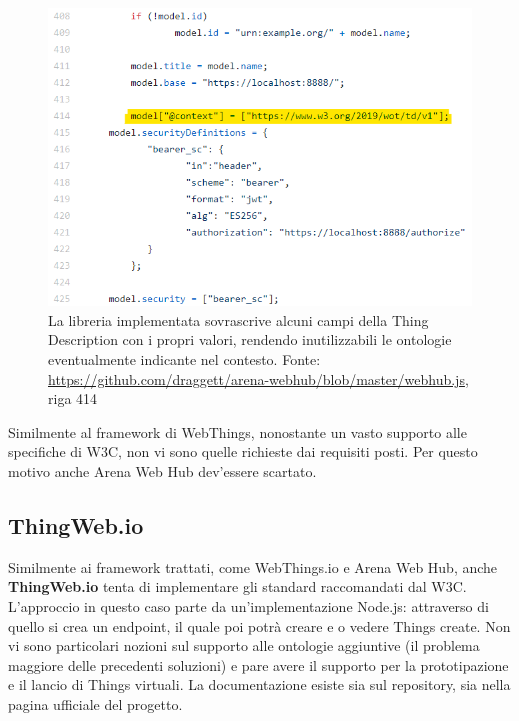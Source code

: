 \documentclass[12pt,a4paper,openright,oneside]{report}
\begin{document}
\begin{figure}[h]
	\centering
	\includegraphics[scale=1]{eps/context_overwritten.png}
	\caption{La libreria implementata sovrascrive alcuni campi della Thing Description con i propri valori, rendendo inutilizzabili le ontologie eventualmente indicante nel contesto. Fonte: \url{https://github.com/draggett/arena-webhub/blob/master/webhub.js}, riga 414}
	\label{fig:context-overwritten}
\end{figure}

Similmente al framework di WebThings, nonostante un vasto supporto alle specifiche di W3C, non vi sono quelle richieste dai requisiti posti. Per questo motivo anche Arena Web Hub dev'essere scartato.


\clearpage
\subsection{ThingWeb.io}
Similmente ai framework trattati, come WebThings.io e Arena Web Hub, anche \textbf{ThingWeb.io} \cite{thingweb} tenta di implementare gli standard raccomandati dal W3C. L'approccio in questo caso parte da un'implementazione Node.js: attraverso di quello si crea un endpoint, il quale poi potrà creare e o vedere Things create. Non vi sono particolari nozioni sul supporto alle ontologie aggiuntive (il problema maggiore delle precedenti soluzioni) e pare avere il supporto per la prototipazione e il lancio di Things virtuali. La documentazione esiste sia sul repository, sia nella pagina ufficiale del progetto.\\
\end{document}
